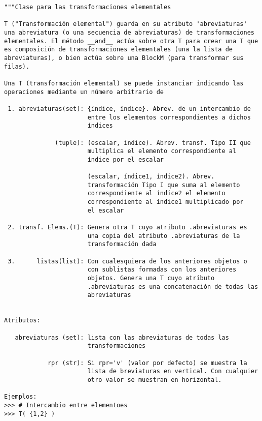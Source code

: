 \documentclass[11pt]{report}
\begin{document}
\begin{verbatim}
"""Clase para las transformaciones elementales

T ("Transformación elemental") guarda en su atributo 'abreviaturas'
una abreviatura (o una secuencia de abreviaturas) de transformaciones
elementales. El método __and__ actúa sobre otra T para crear una T que
es composición de transformaciones elementales (una la lista de
abreviaturas), o bien actúa sobre una BlockM (para transformar sus
filas).

Una T (transformación elemental) se puede instanciar indicando las
operaciones mediante un número arbitrario de

 1. abreviaturas(set): {índice, índice}. Abrev. de un intercambio de
                       entre los elementos correspondientes a dichos
                       índices

              (tuple): (escalar, índice). Abrev. transf. Tipo II que
                       multiplica el elemento correspondiente al
                       índice por el escalar

                       (escalar, índice1, índice2). Abrev.
                       transformación Tipo I que suma al elemento
                       correspondiente al índice2 el elemento
                       correspondiente al índice1 multiplicado por
                       el escalar

 2. transf. Elems.(T): Genera otra T cuyo atributo .abreviaturas es
                       una copia del atributo .abreviaturas de la
                       transformación dada

 3.      listas(list): Con cualesquiera de los anteriores objetos o
                       con sublistas formadas con los anteriores
                       objetos. Genera una T cuyo atributo
                       .abreviaturas es una concatenación de todas las
                       abreviaturas


Atributos:

   abreviaturas (set): lista con las abreviaturas de todas las
                       transformaciones

            rpr (str): Si rpr='v' (valor por defecto) se muestra la
                       lista de breviaturas en vertical. Con cualquier
                       otro valor se muestran en horizontal.

Ejemplos:
>>> # Intercambio entre elementoes
>>> T( {1,2} )


\end{verbatim}
\end{document}
